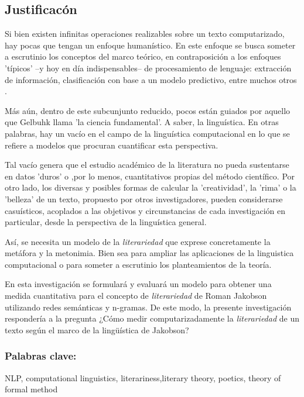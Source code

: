\documentclass[twoside]{article}
\begin{document}
\subsection{Justificacón}
\label{sec:org75f8a03}

Si bien existen infinitas operaciones realizables sobre un texto
computarizado, hay pocas que tengan un enfoque humanístico. En este
enfoque se busca someter a escrutinio los conceptos del marco teórico,
en contraposición a los enfoques 'típicos' --y hoy en día
indispensables-- de procesamiento de lenguaje: extracción de
información, clasificación con base a un modelo predictivo, entre
muchos otros \cite{gelbukh2004}.

Más aún, dentro de este subcunjunto reducido, pocos están guiados por
aquello que Gelbuhk llama 'la ciencia fundamental'. A saber, la
linguística. En otras palabras, hay un vacío en el campo de la
linguística computacional en lo que se refiere a modelos que procuran
cuantificar esta perspectiva.

Tal vacío genera que el estudio académico de la literatura no pueda
sustentarse en datos 'duros' o ,por lo menos, cuantitativos propias
del método científico. Por otro lado, los diversas y posibles formas
de calcular la 'creatividad', la 'rima' o la 'belleza' de un texto,
propuesto por otros investigadores, pueden considerarse casuísticos,
acoplados a las objetivos y circunstancias de cada investigación en
particular, desde la perspectiva de la linguística general.

Así, se necesita un modelo de la \emph{literariedad} que exprese
concretamente la metáfora y la metonimia. Bien sea para ampliar las
aplicaciones de la linguistica computacional o para someter a
escrutinio los planteamientos de la teoría.

En esta investigación se formulará y evaluará un modelo para obtener
una medida cuantitativa para el concepto de \emph{literariedad} de Roman
Jakobson utilizando redes semánticas y n-gramas. De este modo, la
presente investigación respondería a la pregunta ¿Cómo medir
computarizadamente la \emph{literariedad} de un texto según el marco de la
lingüística de Jakobson?

\subsubsection{\textbf{Palabras clave:}}
\label{sec:orgb0cbc1e}
NLP, computational linguistics, literariness,literary theory, poetics, theory of formal method
\end{document}

